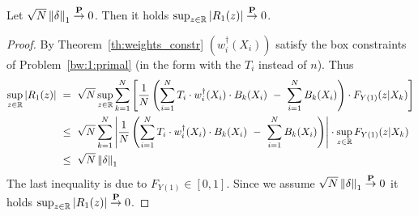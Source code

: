 \begin{lemma}
  \label{aa:mean:l:r1}
  Let
$\sqrt{N}\left\lVert\delta\right\rVert_1\overset{\mathbf{P}}{\to}0$.
Then it holds
$\sup_{z\in\mathbb{R}}|R_1(z)|\overset{\mathbf{P}}{\to}0$.
  \end{lemma}
\begin{proof}
  By Theorem~\ref{th:weights_constr} 
  $(w_i^\dagger(X_i))$
satisfy the box constraints of Problem~\ref{bw:1:primal} (in the form with the $T_i$ instead of $n$).
Thus
  \begin{align}
    \label{R_1:1}
    \begin{split}
    \sup_{z\in\R}
    \left| 
    R_1(z)
    \right|
    &
    \ 
    =
    \ 
  \sqrt{N}
  \sup_{z\in\R}
  \sum_{k=1}^{N} 
  \left[ 
  \frac{1}{N}
  \left( 
    \sum_{i=1}^{N} 
    T_i
    \cdot
    w^\dagger_i(X_i)
    \cdot
    B_k(X_i)
    \ 
    -
    \ 
    \sum_{i=1}^{N} 
    B_k(X_i)
  \right)
  \cdot
  F_{Y(1)}(z|X_k)
  \right]
    \\
    &
    \ 
    \le
    \ 
  \sqrt{N}
  \sum_{k=1}^{N} 
  \left| 
  \frac{1}{N}
  \left( 
    \sum_{i=1}^{N} 
    T_i
    \cdot
    w^\dagger_i(X_i)
    \cdot
    B_k(X_i)
    \ 
    -
    \ 
    \sum_{i=1}^{N} 
    B_k(X_i)
  \right)
  \right|
  \cdot
    \sup_{z\in\R}
  F_{Y(1)}(z|X_k)
  \\
    &
    \ 
    \le
    \ 
  \sqrt{N}
  \norm{\delta}_1
    \end{split}
  \end{align}
  The last inequality is due to $F_{Y(1)}\in[0,1]$.
  Since we assume 
$\sqrt{N}\left\lVert\delta\right\rVert_1\overset{\mathbf{P}}{\to}0$
it holds
$\sup_{z\in\mathbb{R}}|R_1(z)|\overset{\mathbf{P}}{\to}0$.
\end{proof}
